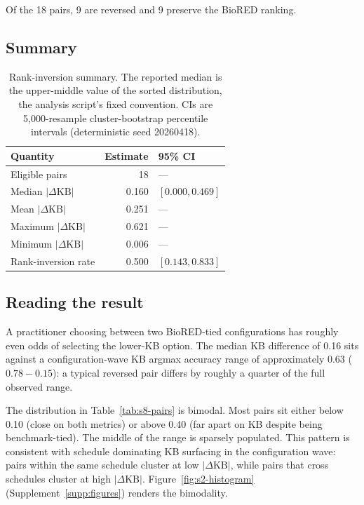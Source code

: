 Of the 18 pairs, 9 are reversed and 9 preserve the BioRED ranking.

\subsection{Summary}

\begin{table}[H]
\centering
\caption{Rank-inversion summary. The reported median is the
upper-middle value of the sorted distribution, the analysis script's
fixed convention. CIs are 5{,}000-resample cluster-bootstrap percentile
intervals (deterministic seed 20260418).}
\label{tab:s8-summary}
\small
\begin{tabular}{@{}lrl@{}}
\toprule
\textbf{Quantity} & \textbf{Estimate} & \textbf{95\% CI} \\
\midrule
Eligible pairs                       & 18    & --- \\
Median $|\Delta\text{KB}|$           & 0.160 & $[0.000, 0.469]$ \\
Mean $|\Delta\text{KB}|$             & 0.251 & --- \\
Maximum $|\Delta\text{KB}|$          & 0.621 & --- \\
Minimum $|\Delta\text{KB}|$          & 0.006 & --- \\
Rank-inversion rate                  & 0.500 & $[0.143, 0.833]$ \\
\bottomrule
\end{tabular}
\end{table}

\subsection{Reading the result}

A practitioner choosing between two BioRED-tied configurations has
roughly even odds of selecting the lower-KB option. The median KB
difference of 0.16 sits against a configuration-wave KB argmax accuracy
range of approximately 0.63 ($0.78 - 0.15$): a typical reversed pair
differs by roughly a quarter of the full observed range.

The distribution in Table~\ref{tab:s8-pairs} is bimodal. Most pairs
sit either below 0.10 (close on both metrics) or above 0.40 (far
apart on KB despite being benchmark-tied). The middle of the range
is sparsely populated. This pattern is consistent with schedule
dominating KB surfacing in the configuration wave: pairs within the
same schedule cluster at low $|\Delta\text{KB}|$, while pairs that
cross schedules cluster at high $|\Delta\text{KB}|$.
Figure~\ref{fig:s2-histogram} (Supplement~\ref{supp:figures})
renders the bimodality.

